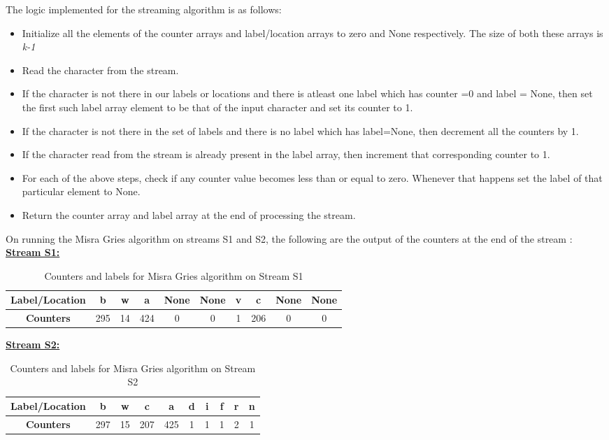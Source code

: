 \documentclass[11pt]{article}
\begin{document}
\begin{itemize}
	The logic implemented for the streaming algorithm is as follows:
	\begin{itemize}
		\item Initialize all the elements of the counter arrays and label/location arrays to zero and None respectively. The size of both these arrays is \emph{k-1}
		\item  Read the character from the stream.
		\item If the character is not there in our labels or locations and there is atleast one label which has counter =0 and label = None, then set the first such label array element to be that of the input character and set its counter to 1.
		\item If the character is not there in the set of labels and there is no label which has label=None, then decrement all the counters by 1.
		\item If the character read from the stream is already present in the label array, then increment that corresponding counter to 1.
		\item For each of the above steps, check if any counter value becomes less than or equal to zero. Whenever that happens set the label of that particular element to None.
		\item Return the counter array and label array at the end of processing the stream.
	\end{itemize}
	On running the Misra Gries algorithm on streams S1 and S2, the following are the output of the counters at the end of the stream :\\
	\textbf{\underline{ Stream S1:}}
	\begin{table}[h]
		\centering
		\begin{tabular}{|c|c| c|c|c|c|c|c|c|c|}
			\hline
			\textbf{Label/Location}  & b & w & a & None & None & v & c & None & None\\
			\hline
			\textbf{Counters}  & 295 & 14 & 424 & 0 & 0 & 1 & 206 & 0 & 0  \\
			\hline
		\end{tabular}
		\caption{Counters and labels for Misra Gries algorithm on Stream S1 }
		\label{t2}
	\end{table}
	
	\pagebreak
	
	\textbf{\underline{ Stream S2:}}
	\begin{table}[h]
		\centering
		\begin{tabular}{|c|c| c|c|c|c|c|c|c|c|}
			\hline
			\textbf{Label/Location}  & b & w & c & a & d & i & f & r & n\\
			\hline
			\textbf{Counters}  & 297 & 15 & 207 & 425 & 1 & 1 & 1 & 2 & 1  \\
			\hline
		\end{tabular}
		\caption{Counters and labels for Misra Gries algorithm on Stream S2 }
		\label{t2}
	\end{table}
	

\end{itemize}
\end{document}
